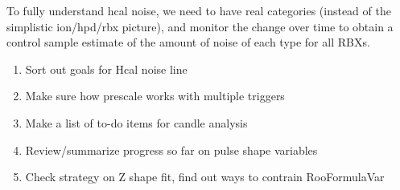 To fully understand hcal noise, we need to have real categories (instead of the simplistic ion/hpd/rbx picture),
and monitor the change over time to obtain a control sample estimate of the amount of noise of each type for all RBXs.



\begin{enumerate}
\item Sort out goals for Hcal noise line
\item Make sure how prescale works with multiple triggers
\item Make a list of to-do items for candle analysis
\item Review/summarize progress so far on pulse shape variables
\item Check strategy on Z shape fit, find out ways to contrain RooFormulaVar
\end{enumerate}


